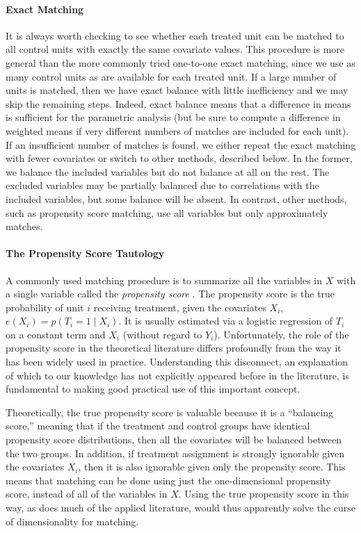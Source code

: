 \documentclass[11pt,titlepage]{article}
\begin{document}
\paragraph{Exact Matching}  
It is always worth checking to see whether each treated unit can be
matched to all control units with exactly the same covariate values.
This procedure is more general than the more commonly tried one-to-one
exact matching, since we use as many control units as are available
for each treated unit.  If a large number of units is matched, then
we have exact balance with little inefficiency and we may skip the
remaining steps.  Indeed, exact balance means that a difference in
means is sufficient for the parametric analysis (but be sure to
compute a difference in weighted means if very different numbers of
matches are included for each unit).  If an insufficient number of
matches is found, we either repeat the exact matching with fewer
covariates or switch to other methods, described below.  In the
former, we balance the included variables but do not balance at all on
the rest.  The excluded variables may be partially balanced due to
correlations with the included variables, but some balance will be
absent.  In contrast, other methods, such as propensity score
matching, use all variables but only approximately matches.

\paragraph{The Propensity Score Tautology}
A commonly used matching procedure is to summarize all the variables
in $X$ with a single variable called the \emph{propensity score}
\citep{RosRub83}.  The propensity score is the true probability of
unit $i$ receiving treatment, given the covariates $X_i$, $e(X_i) =
p(T_i=1 \mid X_i)$.  It is usually estimated via a logistic regression
of $T_i$ on a constant term and $X_i$ (without regard to $Y_i$).
Unfortunately, the role of the propensity score in the theoretical
literature differs profoundly from the way it has been widely used in
practice.  Understanding this disconnect, an explanation of which to
our knowledge has not explicitly appeared before in the literature, is
fundamental to making good practical use of this important concept.

Theoretically, the true propensity score is valuable because it is a
``balancing score,'' meaning that if the treatment and control groups
have identical propensity score distributions, then all the covariates
will be balanced between the two groups.  In addition, if treatment
assignment is strongly ignorable given the covariates $X_i$, then it
is also ignorable given only the propensity score.  This means that
matching can be done using just the one-dimensional propensity score,
instead of all of the variables in $X$.  Using the true propensity
score in this way, as does much of the applied literature, would thus
apparently solve the curse of dimensionality for matching.
\end{document}
